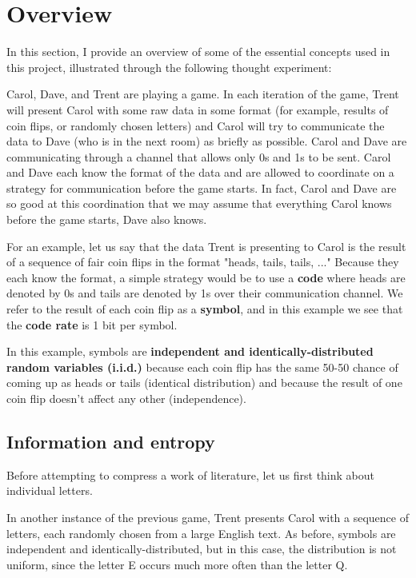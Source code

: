 \chapter{Overview}
\label{chap:overview}

In this section, I provide an overview of some of the essential concepts used in this project, illustrated through the following thought experiment:

Carol, Dave, and Trent are playing a game. In each iteration of the game, Trent will present Carol with some raw data in some format (for example, results of coin flips, or randomly chosen letters) and Carol will try to communicate the data to Dave (who is in the next room) as briefly as possible. Carol and Dave are communicating through a channel that allows only 0s and 1s to be sent. Carol and Dave each know the format of the data and are allowed to coordinate on a strategy for communication before the game starts. In fact, Carol and Dave are so good at this coordination that we may assume that everything Carol knows before the game starts, Dave also knows.

For an example, let us say that the data Trent is presenting to Carol is the result of a sequence of fair coin flips in the format "heads, tails, tails, ..." Because they each know the format, a simple strategy would be to use a \textbf{code} where heads are denoted by 0s and tails are denoted by 1s over their communication channel. We refer to the result of each coin flip as a \textbf{symbol}, and in this example we see that the \textbf{code rate} is 1 bit per symbol.

In this example, symbols are \textbf{independent and identically-distributed random variables (i.i.d.)} because each coin flip has the same 50-50 chance of coming up as heads or tails (identical distribution) and because the result of one coin flip doesn't affect any other (independence).

\section{Information and entropy}
\label{sec:information_and_entropy}

Before attempting to compress a work of literature, let us first think about individual letters.

In another instance of the previous game, Trent presents Carol with a sequence of letters, each randomly chosen from a large English text. As before, symbols are independent and identically-distributed, but in this case, the distribution is not uniform, since the letter E occurs much more often than the letter Q.

